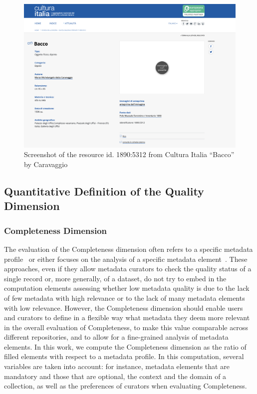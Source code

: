 \documentclass[epsfig,a4paper,12pt,titlepage]{book}
\begin{document}
\begin{figure}[h]
 \centering
\includegraphics[width=16cm]{Screenshot 2021-07-01 at 17.26.34.png}
\caption{Screenshot of the resource id. 1890:5312 from Cultura Italia ``Bacco'' by Caravaggio}
\label{bacco}
\end{figure}

\subsection{Quantitative Definition of the Quality Dimension}
\subsubsection{Completeness Dimension}
The evaluation of the Completeness dimension often refers to a specific metadata profile~\cite{kiraly2015metadata} or either focuses on the analysis of a specific metadata element~\cite{margaritopoulos2009fine}. These approaches, even if they allow metadata curators to check the quality status of a single record or, more generally, of a dataset, do not try to embed in the computation elements assessing whether low metadata quality is due to the lack of few metadata with high relevance or to the lack of many metadata elements with low relevance. However, the Completeness dimension should enable users and curators to define in a flexible way what metadata they deem more relevant in the overall evaluation of Completeness, to make this value comparable across different repositories, and to allow for a fine-grained analysis of metadata elements.
In this work, we compute the Completeness dimension as the ratio of filled elements with respect to a metadata profile. In this computation, several variables are taken into account: for instance, metadata elements that are mandatory and those that are optional, the context and the domain of a collection, as well as the preferences of curators when evaluating Completeness.  
\end{document}
